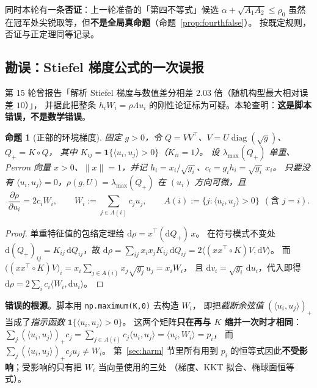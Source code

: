 \documentclass[UTF8,11pt]{ctexart}
\newtheorem{proposition}[theorem]{命题}
\theoremstyle{definition}
\newcommand{\Lam}{\Lambda}
\begin{document}
同时本轮有一条\textbf{否证}：上一轮准备的「第四不等式」候选 $\alpha+\sqrt{A_1A_2}\le\rho_0$
虽然在冠军处尖锐取等，但\textbf{不是全局真命题}（命题~\ref{prop:fourthfalse}）。
按既定规则，否证与正定理同等记录。

\subsection{勘误：Stiefel 梯度公式的一次误报}\label{sec:r17:erratum}

第 15 轮曾报告「解析 Stiefel 梯度与数值差分相差 $2.03$ 倍（随机构型最大相对误差 $10$）」，
并据此把整条 $h_iW_i=\rho\Lam u_i$ 的刚性论证标为可疑。本轮查明：\textbf{这是脚本错误，不是数学错误}。

\begin{proposition}[正部的环境梯度]\label{prop:gradformula}
固定 $g>0$，令 $Q=VV^\top$、$V=U\operatorname{diag}(\sqrt g)$、$Q_+=K\circ Q$，
其中 $K_{ij}=\mathbf 1\{\langle u_i,u_j\rangle>0\}$（$K_{ii}=1$）。
设 $\lambda_{\max}(Q_+)$ 单重、Perron 向量 $x>0$、$\|x\|=1$，并记 $h_i=x_i/\sqrt{g_i}$、$c_i=g_ih_i=\sqrt{g_i}\,x_i$。
只要没有 $\langle u_i,u_j\rangle=0$，$\rho(g,U)=\lambda_{\max}(Q_+)$ 在 $(u_i)$ 方向可微，且
\begin{equation}\label{eq:gradu}
\frac{\partial\rho}{\partial u_i}=2c_iW_i,\qquad
W_i:=\sum_{j\in A(i)}c_ju_j,\qquad A(i):=\{j:\langle u_i,u_j\rangle>0\}\ \ (\text{含 }j=i).
\end{equation}
\end{proposition}

\begin{proof}
单重特征值的包络定理给 $\mathrm d\rho=x^\top(\mathrm dQ_+)\,x$。
在符号模式不变处 $\mathrm d(Q_+)_{ij}=K_{ij}\,\mathrm dQ_{ij}$，故
$\mathrm d\rho=\sum_{ij}x_ix_jK_{ij}\,\mathrm dQ_{ij}=2\bigl\langle (xx^\top\!\circ K)V,\mathrm dV\bigr\rangle$。
而 $\bigl((xx^\top\!\circ K)V\bigr)_i=x_i\sum_{j\in A(i)}x_j\sqrt{g_j}\,u_j=x_iW_i$，
且 $\mathrm dv_i=\sqrt{g_i}\,\mathrm du_i$，代入即得 $\mathrm d\rho=2\sum_ic_i\langle W_i,\mathrm du_i\rangle$。
\end{proof}

\textbf{错误的根源}。脚本用 \texttt{np.maximum(K,0)} 去构造 $W_i$，
即把\emph{截断余弦值} $(\langle u_i,u_j\rangle)_+$ 当成了\emph{指示函数} $\mathbf 1\{\langle u_i,u_j\rangle>0\}$。
这两个矩阵\textbf{只在再与 $K$ 缩并一次时才相同}：
$\sum_j(\langle u_i,u_j\rangle)_+c_j=\sum_{j\in A(i)}c_j\langle u_i,u_j\rangle=\langle u_i,W_i\rangle=p_i$，
而 $\sum_j(\langle u_i,u_j\rangle)_+c_ju_j\ne W_i$。
第~\ref{sec:harm} 节里所有用到 $p_i$ 的恒等式因此\textbf{不受影响}；受影响的只有把 $W_i$ 当向量使用的三处
（梯度、KKT 拟合、椭球面恒等式）。
\end{document}
